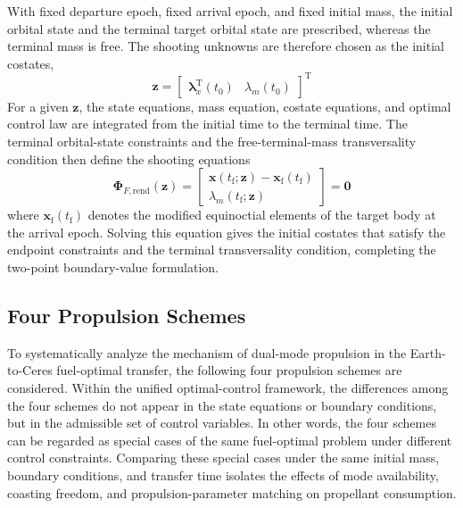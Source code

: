 ﻿\documentclass{IEEEtaes}
\begin{document}
With fixed departure epoch, fixed arrival epoch, and fixed initial mass, the initial orbital state and the terminal target orbital state are prescribed, whereas the terminal mass is free. The shooting unknowns are therefore chosen as the initial costates,
\begin{equation}
\bm{z}=\begin{bmatrix}\bm{\lambda}_x^{\mathrm{T}}(t_0)&\lambda_m(t_0)\end{bmatrix}^{\mathrm{T}}
\end{equation}
For a given $\bm{z}$, the state equations, mass equation, costate equations, and optimal control law are integrated from the initial time to the terminal time. The terminal orbital-state constraints and the free-terminal-mass transversality condition then define the shooting equations
\begin{equation}
\bm{\Phi}_{F,\mathrm{rend}}(\bm{z})=
\begin{bmatrix}
\bm{x}(t_{\mathrm{f}};\bm{z})-\bm{x}_{\mathrm{f}}(t_{\mathrm{f}})\\
\lambda_m(t_{\mathrm{f}};\bm{z})
\end{bmatrix}=\bm{0}
\end{equation}
where $\bm{x}_{\mathrm{f}}(t_{\mathrm{f}})$ denotes the modified equinoctial elements of the target body at the arrival epoch. Solving this equation gives the initial costates that satisfy the endpoint constraints and the terminal transversality condition, completing the two-point boundary-value formulation.

\subsection{Four Propulsion Schemes}
To systematically analyze the mechanism of dual-mode propulsion in the Earth-to-Ceres fuel-optimal transfer, the following four propulsion schemes are considered. Within the unified optimal-control framework, the differences among the four schemes do not appear in the state equations or boundary conditions, but in the admissible set of control variables. In other words, the four schemes can be regarded as special cases of the same fuel-optimal problem under different control constraints. Comparing these special cases under the same initial mass, boundary conditions, and transfer time isolates the effects of mode availability, coasting freedom, and propulsion-parameter matching on propellant consumption.
\end{document}
